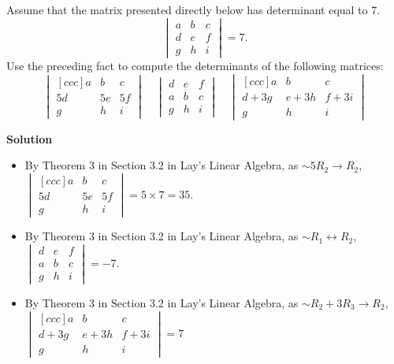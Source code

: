\documentclass[11pt]{scrartcl}
\theoremstyle{dotlessP}
\theoremstyle{dotlessN}
\begin{document}
\begin{ques}
	Assume that the matrix presented directly below has determinant equal to 7.
	\[
	\begin{vmatrix}
		a & b & c \\
		d & e & f \\
		g & h & i 
	\end{vmatrix} = 7.
	\]
	Use the preceding fact to compute the determinants of the following matrices:
	\[
		\begin{vmatrix}[ccc]
		a & b & c \\
		5d & 5e & 5f \\
		g & h & i
	\end{vmatrix} \quad
	\begin{vmatrix}
		d & e & f \\
		a & b & c \\
		g & h & i
	\end{vmatrix} \quad
	\begin{vmatrix}[ccc]
		a & b & c \\
		d + 3g & e + 3h & f + 3i \\
		g & h & i
	\end{vmatrix}
	\] 
\end{ques}
\textbf{Solution}
\begin{itemize}
	\item By Theorem 3 in Section 3.2 in Lay's Linear Algebra, as $\sim 5R_2 \to R_2$, $		\begin{vmatrix}[ccc]
		a & b & c \\
		5d & 5e & 5f \\
		g & h & i
	\end{vmatrix} = 5 \times 7 = 35$.
\item By Theorem 3 in Section 3.2 in Lay's Linear Algebra, as $\sim R_1 \leftrightarrow R_2$, $
	\begin{vmatrix}
		d & e & f \\
		a & b & c \\
		g & h & i
	\end{vmatrix} = - 7
	$.
\item By Theorem 3 in Section 3.2 in Lay's Linear Algebra, as $\sim R_2 + 3R_3 \to R_2$, $
	\begin{vmatrix}[ccc]
		a & b & c \\
		d + 3g & e + 3h & f + 3i \\
		g & h & i
	\end{vmatrix} = 7
	$
\end{itemize}
\end{document}

